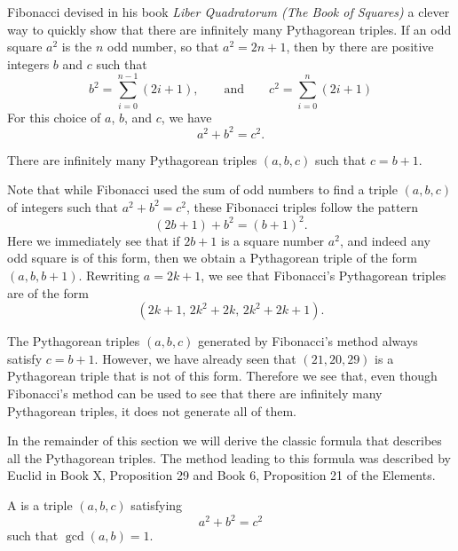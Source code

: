 Fibonacci devised in his book \emph{Liber Quadratorum (The Book of Squares)} \cite{fibonacci1987} a clever way to quickly show that there are infinitely many Pythagorean triples. If an odd square $a^2$ is the $n$\supth{} odd number, so that $a^2=2n+1$, then by  there are positive integers $b$ and $c$ such that
\begin{equation*}
  b^2 = \sum_{i=0}^{n-1}(2i+1),\qquad\text{and}\qquad c^2=\sum_{i=0}^{n}(2i+1)
\end{equation*}
For this choice of $a$, $b$, and $c$, we have
\begin{equation*}
  a^2 + b^2 = c^2.
\end{equation*}

\begin{proposition}
  There are infinitely many Pythagorean triples $(a,b,c)$ such that $c=b+1$.
\end{proposition}

Note that while Fibonacci used the sum of odd numbers to find a triple $(a,b,c)$ of integers such that $a^2+b^2=c^2$, these Fibonacci triples follow the pattern
\begin{equation*}
  (2b + 1) + b^2 = (b+1)^2.
\end{equation*}
Here we immediately see that if $2b+1$ is a square number $a^2$, and indeed any odd square is of this form, then we obtain a Pythagorean triple of the form $(a,b,b+1)$. Rewriting $a=2k+1$, we see that Fibonacci's Pythagorean triples are of the form
\begin{equation*}
  (2k+1,\,2k^2 + 2k,\,2k^2 + 2k+1).
\end{equation*}

The Pythagorean triples $(a,b,c)$ generated by Fibonacci's method always satisfy $c=b+1$. However, we have already seen that $(21,20,29)$ is a Pythagorean triple that is not of this form. Therefore we see that, even though Fibonacci's method can be used to see that there are infinitely many Pythagorean triples, it does not generate all of them.

In the remainder of this section we will derive the classic formula that describes all the Pythagorean triples. The method leading to this formula was described by Euclid in Book X, Proposition 29 and Book 6, Proposition 21 of the Elements.

\begin{definition}
  A  is a triple $(a,b,c)$ satisfying
  \begin{equation*}
    a^2 + b^2 = c^2
  \end{equation*}
  such that $\gcd(a,b)=1$.
\end{definition}

